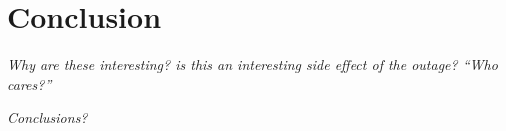 \begin{figure}[tp]

\end{figure}


\section{Conclusion}

\textit{Why are these interesting? is this an interesting side effect of the outage? ``Who cares?''}

\textit{Conclusions?}


